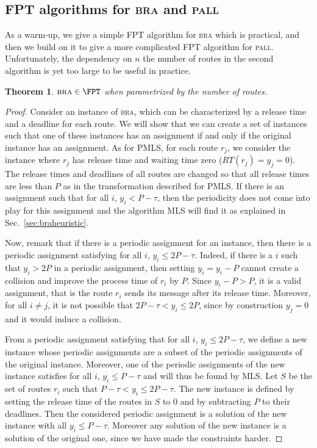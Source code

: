 \documentclass[a4paper,10pt]{article}
\newtheorem{theorem}{Theorem}
\newcommand\pall{\textsc{pall}\xspace}
\newcommand\bra{\textsc{bra}\xspace}
\begin{document}
\subsection{FPT algorithms for \bra and \pall}

As a warm-up, we give a simple FPT algorithm for \bra which is practical,
and then we build on it to give a more complicated FPT algorithm for \pall. Unfortunately, the dependency on $n$ the number of routes in the second algorithm is yet too large to be useful in practice. 

\begin{theorem}\label{th:braFPT}
$\bra \in \FPT$ when parametrized by the number of routes.
\end{theorem}
\begin{proof}
 Consider an instance of \bra, which can be characterized by a release time and a deadline for each route.
 We will show that we can create a set of instances such that one of these instances has an assignment if and only if the original instance has an assignment. As for PMLS, for each route $r_j$, we consider the instance where $r_j$ has release time and waiting time zero ($RT(r_j) = y_j = 0$). The release times and deadlines of all routes are changed so that all release times are less than $P$ as in the transformation described for PMLS. If there is an assignment such that for all $i$, $y_i < P-\tau$, then the periodicity does not come into play for this assignment and the algorithm MLS will find it as explained in Sec.~\ref{sec:braheuristic}.

 Now, remark that if there is a periodic assignment for an instance, then there is a periodic assignment satisfying for all $i$, $y_i \leq 2P - \tau$.  Indeed, if there is a $i$ such that $y_i > 2P$ in
a periodic assignment, then setting $y_i = y_i - P$ cannot create a collision and improve the 
process time of $r_i$ by $P$. Since $y_i - P > P$, it is a valid assignment, that is the route $r_i$ sends its message after its release time. Moreover, for all $i \neq j$, it is not possible that $2P-\tau < y_i \leq 2P$, since by construction $y_j = 0$ and it would induce a collision.
 

From a periodic assignment satisfying that for all $i$, $y_i \leq 2P - \tau$, we define 
a new instance whose periodic assignments are a subset of the periodic assignments of the original instance. Moreover, one of the periodic assignments of the new instance satisfies for all $i$, $y_i \leq P - \tau$ and will thus be found by MLS. Let $S$ be the set of routes $r_i$ such that  $P - \tau < y_i \leq 2P - \tau$. The new instance is defined by setting the release time of the routes in $S$ to $0$ and by subtracting $P$ to their deadlines. Then the considered periodic assignment is a solution of the new instance with all $y_i \leq P -\tau$. Moreover any solution of the new instance is a solution of the original one, since we have made the constraints harder.   


\end{proof}
\end{document}
